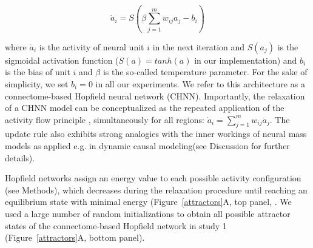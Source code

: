 \documentclass{article}
\begin{document}
\begin{equation}
\label{hopfield-update}
\dot{a}_i = S(\beta \sum_{j=1}^m w_{ij}a_j - b_i)
\end{equation}

where $\dot{a}_i$ is the activity of neural unit $i$ in the next iteration and $S(a_j)$ is the sigmoidal activation
function ($S(a) = tanh(a)$ in our implementation) and $b_i$ is the bias of unit $i$ and $\beta$ is the so-called temperature parameter. For the sake of simplicity, we set $b_i=0$ in all our experiments. We refer to this architecture as a connectome-based
Hopfield neural network (CHNN). Importantly, the relaxation of a CHNN model can be conceptualized as the repeated
application of the activity flow principle \citep{cole2016activity, ito2017cognitive} , simultaneously for all
regions: $\dot{a}_i = \sum_{j=1}^m w_{ij}a_j$. The update rule also exhibits strong analogies with the inner workings
of neural mass models \citep{breakspear2017dynamic} as applied e.g. in dynamic causal modeling(see Discussion for
further details).

Hopfield networks assign an energy value to each possible activity configuration (see Methods), which decreases during
the relaxation procedure until reaching an equilibrium state with minimal energy (Figure~\ref{attractors}A, top panel,
\citep{hopfield1982neural, koiran1994dynamics}.
We used a large number of random initializations to obtain all possible attractor states of the connectome-based
Hopfield network in study 1 (Figure~\ref{attractors}A, bottom panel).
\end{document}

